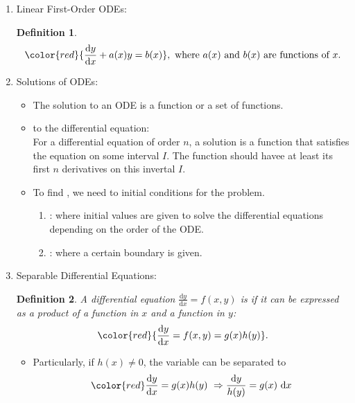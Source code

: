 \documentclass[12pt, a4paper]{article}
\newtheorem{definition}{Definition}[subsection]
\def\d{{\mathrm{d}}}
\begin{document}
\begin{enumerate}
    \item Linear First-Order ODEs: 
    \begin{definition}
        $${\color{red}{\frac{\d y}{\d x}+a(x)y=b(x)}},\text{ where }a(x)\text{ and }b(x)\text{ are functions of }x.$$
    \end{definition}
    \item Solutions of ODEs: 
    \begin{itemize}
        \item The solution to an ODE is a function or a set of functions.
        \item {\color{red}{General solution}} to the differential equation: \\
        For a differential equation of order $n$, a solution is a function that satisfies the equation on some interval $I$. The function should havee at least its first $n$ derivatives on this invertal $I$. 
        \item To find {\color{red}{particular solutions}}, we need to initial conditions for the problem. 
        \begin{enumerate}
            \item {\color{red}{Initial Value Problem (IVP)}}: where initial values are given to solve the differential equations depending on the order of the ODE. \\
            {\color{green}{E.g. $y(0),\ t(0),\ (0,y)$.}}
            \item {\color{red}{Boundary Value Problem}}: where a certain boundary is given. \\
            {\color{green}{E.g. $(x,y)$.}}
        \end{enumerate}
    \end{itemize}
    \item Separable Differential Equations: 
    \begin{definition}
        A differential equation $\frac{\d y}{\d x}=f(x,y)$ is \textbf{\color{red}{separable}} if it can be expressed as a product of a function in $x$ and a function in $y$: 
        $${\color{red}{\frac{\d y}{\d x}=f(x,y)=g(x)h(y)}}.$$
    \end{definition}
    \begin{itemize}
        \item Particularly, if $h(x)\neq 0$, the variable can be separated to 
        $$\color{red}\begin{aligned}
            {\frac{\d y}{\d x}=g(x)h(y)}\ \Rightarrow \frac{\d y}{h(y)}&=g(x)\ \d x\\

\end{aligned}$$
\end{itemize}
\end{enumerate}
\end{document}
